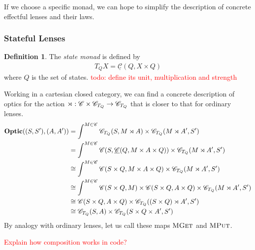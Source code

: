 \documentclass[11pt,letterpaper]{article}
\theoremstyle{plain}
\theoremstyle{definition}
\newtheorem{definition}[theorem]{Definition}
\newcommand{\C}{\mathscr{C}}
\newcommand{\homC}{\underline{\C}}
\newcommand{\Optic}{\mathbf{Optic}}
\newcommand{\mget}{\textsc{MGet}}
\newcommand{\mput}{\textsc{MPut}}
\newcommand{\todo}[1]{\textcolor{red}{\small #1}}
\begin{document}
If we choose a specific monad, we can hope to simplify the description of concrete effectful lenses and their laws.

%

\subsubsection{Stateful Lenses}

\begin{definition}
The \emph{state monad} is defined by
\begin{align*}
T_Q X = \homC(Q, X \times Q)
\end{align*}
where $Q$ is the set of states.
\todo{todo: define its unit, multiplication and strength}
\end{definition}

Working in a cartesian closed category, we can find a concrete description of optics for the action $\monact : \C \times \C_{T_Q} \to \C_{T_Q}$ that is closer to that for ordinary lenses.
\begin{align*}
\Optic((S, S'), (A, A'))
&= \int^{M \in \C} \C_{T_Q}(S, M \monact A) \times \C_{T_Q}(M \monact A', S') \\
&= \int^{M \in \C} \C(S, \homC(Q, M \times A \times Q)) \times \C_{T_Q}(M \monact A', S') \\
&\cong \int^{M \in \C} \C(S \times Q, M \times A\times Q) \times \C_{T_Q}(M \monact A', S') \\
&\cong \int^{M \in \C} \C(S \times Q, M) \times \C(S \times Q, A\times Q) \times \C_{T_Q}(M \monact A', S') \\
&\cong \C(S \times Q, A \times Q) \times \C_{T_Q}((S \times Q) \monact A', S') \\
&\cong \C_{T_Q}(S, A) \times \C_{T_Q}(S \times Q \times A', S')
\end{align*}
By analogy with ordinary lenses, let us call these maps $\mget$ and $\mput$.

\todo{Explain how composition works in code?}
\end{document}

